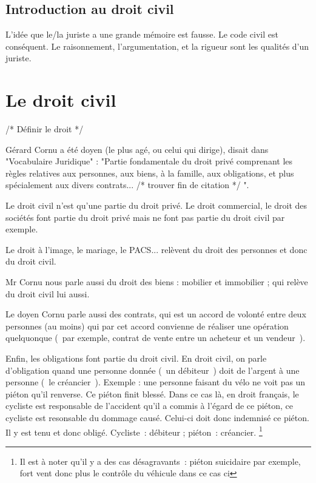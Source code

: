 \chapter{Introduction au droit civil}

L'idée que le/la juriste a une grande mémoire est fausse. Le code civil est conséquent. Le raisonnement, l'argumentation, et la rigueur sont les qualités d'un juriste. \newline

\part{Le droit civil}

/* Définir le droit */

Gérard Cornu a été doyen (le plus agé, ou celui qui dirige), disait dans "Vocabulaire Juridique" : "Partie fondamentale du droit privé comprenant les règles relatives aux personnes, aux biens, à la famille, aux obligations, et plus spécialement aux divers contrats... /* trouver fin de citation */ ". \newline

Le droit civil n'est qu'une partie du droit privé. Le droit commercial, le droit des sociétés font partie du droit privé mais ne font pas partie du droit civil par exemple. \newline

Le droit à l'image, le mariage, le PACS... relèvent du droit des personnes et donc du droit civil. \newline

Mr Cornu nous parle aussi du droit des biens : mobilier et immobilier ; qui relève du droit civil lui aussi. \newline

Le doyen Cornu parle aussi des contrats, qui est un accord de volonté entre deux personnes (au moins) qui par cet accord convienne de réaliser une opération quelquonque (~par exemple, contrat de vente entre un acheteur et un vendeur~).\newline

Enfin, les obligations font partie du droit civil. En droit civil, on parle d'obligation quand une personne donnée (~un débiteur~) doit de l'argent à une personne (~le créancier~). Exemple : une personne faisant du vélo ne voit pas un piéton qu'il renverse. Ce piéton finit blessé. Dans ce cas là, en droit français, le cycliste est responsable de l'accident qu'il a commis à l'égard de ce piéton, ce cycliste est resonsable du dommage causé. Celui-ci doit donc indemnisé ce piéton. Il y est tenu et donc obligé. Cycliste~: débiteur ; piéton~: créancier. \footnote{Il est à noter qu'il y a des cas désagravants~: piéton suicidaire par exemple, fort vent donc plus le contrôle du véhicule dans ce cas ci} \newline

